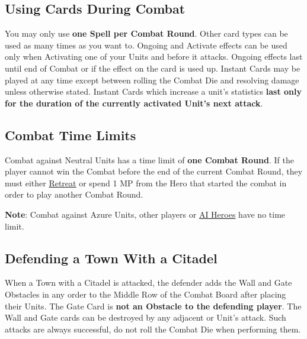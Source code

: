\subsection*{\hypertarget{CombatCards}{Using Cards During Combat}}
You may only use \textbf{one Spell per Combat Round}.
Other card types can be used as many times as you want to.
Ongoing  and  Activate effects can be used only when Activating one of your Units and before it attacks.
Ongoing effects last until end of Combat or if the effect on the card is used up.
Instant  Cards may be played at any time except between rolling the Combat Die and resolving damage unless otherwise stated.
Instant Cards which increase a unit's statistics \textbf{last only for the duration of the currently activated Unit's next attack}.
\subsection*{\hypertarget{Timelimit}{Combat Time Limits}}
Combat against Neutral Units has a time limit of \textbf{one Combat Round}.
If the player cannot win the Combat before the end of the current Combat Round, they must either \hyperlink{Endcombat}{Retreat} or spend 1 MP from the Hero that started the combat in order to play another Combat Round.\par
\textbf{Note}: Combat against Azure  Units, other players or \hyperlink{AIrules}{AI Heroes} have no time limit.
\clearpage
\subsection*{\hypertarget{Walls}{Defending a Town With a Citadel}}

When a Town with a Citadel is attacked, the defender adds the Wall and Gate Obstacles in any order to the Middle Row of the Combat Board after placing their Units.
The Gate Card is \textbf{not an Obstacle to the defending player}.
The Wall and Gate cards can be destroyed by any adjacent  or  Unit's attack.
Such attacks are always successful, do not roll the Combat Die when performing them.\par

